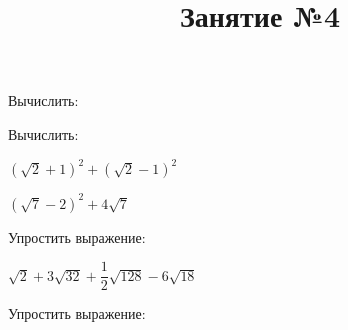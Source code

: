 \newpage
\title{Занятие №4}
\begin{listofex}
	\item Вычислить:
	\begin{enumcols}[itemcolumns=2]
		\item {}
		\item {}
		\item {}
		\item {}
		\item {}
		\item {}
	\end{enumcols}
	\item Вычислить:
	\begin{enumcols}[itemcolumns=2]
		\item {}
		\item {}
		\item {}
		\item {}
		\item \( (\sqrt{2}+1)^2+(\sqrt{2}-1)^2 \) 
		\item \( (\sqrt{7}-2)^2+4\sqrt{7} \) 
	\end{enumcols}
	\item Упростить выражение:
	\begin{enumcols}[itemcolumns=2]
		\item \( \sqrt{2}+3\sqrt{32}+\dfrac{1}{2}\sqrt{128}-6\sqrt{18} \) 
		\item {}
		\item {}
		\item {}
		\item {}
	\end{enumcols}
	\item Упростить выражение:

\end{listofex}
